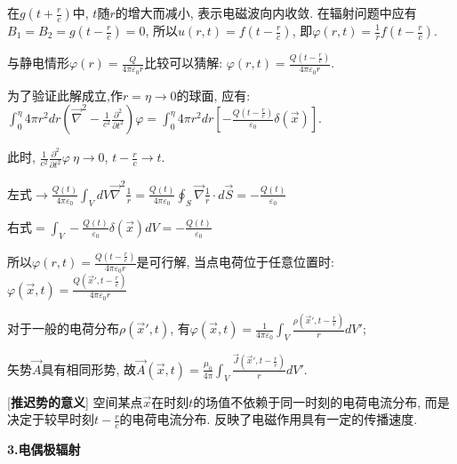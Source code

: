 \qquad 在$g(t+\frac{r}{c})$中, $t$随$r$的增大而减小, 表示电磁波向内收敛. 在辐射问题中应有$B_1=B_2=g(t-\frac{r}{c})=0$, 所以$u(r,t)=f(t-\frac{r}{c})$, 即$\varphi(r,t)=\frac{1}{r}f(t-\frac{r}{c})$.\par
\qquad 与静电情形$\varphi(r)=\frac{Q}{4\pi\varepsilon_0r}$比较可以猜解: $\varphi(r,t)=\frac{Q(t-\frac{r}{c})}{4\pi\varepsilon_0r}$.\par
\qquad \quad 为了验证此解成立,作$r=\eta\to 0$的球面, 应有: $\int_0^\eta 4\pi r^2dr\left(\vec\nabla^2-\frac{1}{c^2}\frac{\partial^2}{\partial t^2}\right)\varphi=\int_0^\eta 4\pi r^2dr\left[-\frac{Q(t-\frac{r}{c})}{\varepsilon_0}\delta(\vec x)\right]$.\par
\qquad \qquad \qquad 此时, $\frac{1}{c^2}\frac{\partial^2}{\partial t^2}\varphi ~ \eta\to 0$, $t-\frac{r}{c}\to t$.\par
\qquad \qquad \qquad 左式$\to \frac{Q(t)}{4\pi\varepsilon_0}\int_VdV\vec\nabla^2\frac{1}{r}=\frac{Q(t)}{4\pi\varepsilon_0}\oint_S\vec\nabla\frac{1}{r}\cdot d\vec S=-\frac{Q(t)}{\varepsilon_0}$\par
\qquad \qquad \qquad 右式$=\int_V-\frac{Q(t)}{\varepsilon_0}\delta(\vec x)dV=-\frac{Q(t)}{\varepsilon_0}$\par
\qquad \quad 所以$\varphi(r,t)=\frac{Q(t-\frac{r}{c})}{4\pi\varepsilon_0r}$是可行解, 当点电荷位于任意位置时: $\varphi(\vec x,t)=\frac{Q(\vec x',t-\frac{r}{c})}{4\pi\varepsilon_0r}$\par
\qquad 对于一般的电荷分布$\rho(\vec x',t)$, 有$\varphi(\vec x,t)=\frac{1}{4\pi\varepsilon_0}\int_V\frac{\rho(\vec x', t-\frac{r}{c})}{r}dV'$;\par
\qquad 矢势$\vec A$具有相同形势, 故$\vec A(\vec x,t)=\frac{\mu_0}{4\pi}\int_V\frac{\vec J(\vec x',t-\frac{r}{c})}{r}dV'$.\par

[\textbf{推迟势的意义}] 空间某点$\vec x$在时刻$t$的场值不依赖于同一时刻的电荷电流分布, 而是决定于较早时刻$t-\frac{r}{c}$的电荷电流分布. 反映了电磁作用具有一定的传播速度.\par

\clearpage

\begin{center}
 \textbf{3.电偶极辐射}
\end{center}

